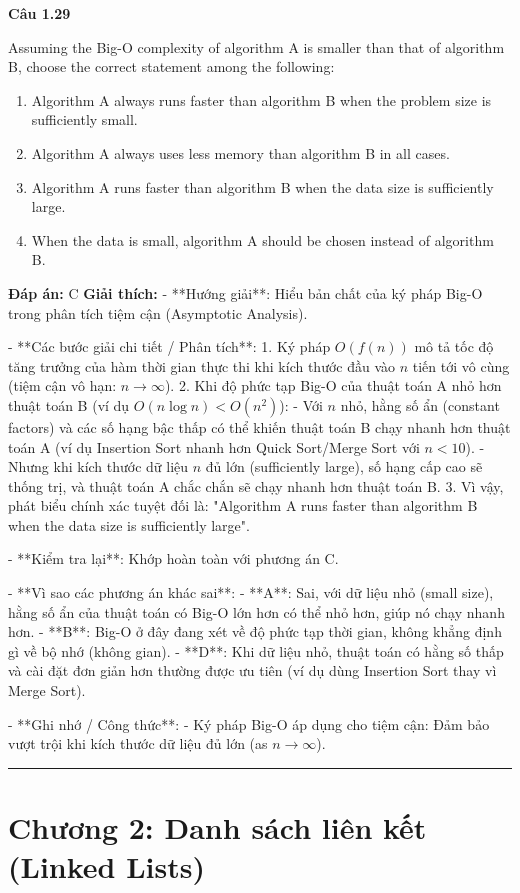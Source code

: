 \documentclass[11pt,a4paper]{article}
\newenvironment{question}[1]{%
  \par\vspace{1em}\noindent\textbf{\large Câu #1}\par\vspace{0.4em}
}{%
  \par\vspace{1em}\hrule\vspace{0.6em}
}
\newenvironment{choices}{%
  \begin{enumerate}[label=\textbf{\Alph*.},leftmargin=2.2em,itemsep=2pt,topsep=3pt]
}{%
  \end{enumerate}
}
\newcommand{\choice}{\item}
\begin{document}
\begin{question}{1.29}
Assuming the Big-O complexity of algorithm A is smaller than that of algorithm B, choose the correct statement among the following:
\begin{choices}
\choice Algorithm A always runs faster than algorithm B when the problem size is sufficiently small.
\choice Algorithm A always uses less memory than algorithm B in all cases.
\choice Algorithm A runs faster than algorithm B when the data size is sufficiently large.
\choice When the data is small, algorithm A should be chosen instead of algorithm B.
\end{choices}
\textbf{Đáp án:} C
\textbf{Giải thích:} - **Hướng giải**:
  Hiểu bản chất của ký pháp Big-O trong phân tích tiệm cận (Asymptotic Analysis).

- **Các bước giải chi tiết / Phân tích**:
  1. Ký pháp \(O(f(n))\) mô tả tốc độ tăng trưởng của hàm thời gian thực thi khi kích thước đầu vào \(n\) tiến tới vô cùng (tiệm cận vô hạn: \(n \rightarrow \infty\)).
  2. Khi độ phức tạp Big-O của thuật toán A nhỏ hơn thuật toán B (ví dụ \(O(n \log n) < O(n^2)\)):
     - Với \(n\) nhỏ, hằng số ẩn (constant factors) và các số hạng bậc thấp có thể khiến thuật toán B chạy nhanh hơn thuật toán A (ví dụ Insertion Sort nhanh hơn Quick Sort/Merge Sort với \(n < 10\)).
     - Nhưng khi kích thước dữ liệu \(n\) đủ lớn (sufficiently large), số hạng cấp cao sẽ thống trị, và thuật toán A chắc chắn sẽ chạy nhanh hơn thuật toán B.
  3. Vì vậy, phát biểu chính xác tuyệt đối là: "Algorithm A runs faster than algorithm B when the data size is sufficiently large".

- **Kiểm tra lại**:
  Khớp hoàn toàn với phương án C.

- **Vì sao các phương án khác sai**:
  - **A**: Sai, với dữ liệu nhỏ (small size), hằng số ẩn của thuật toán có Big-O lớn hơn có thể nhỏ hơn, giúp nó chạy nhanh hơn.
  - **B**: Big-O ở đây đang xét về độ phức tạp thời gian, không khẳng định gì về bộ nhớ (không gian).
  - **D**: Khi dữ liệu nhỏ, thuật toán có hằng số thấp và cài đặt đơn giản hơn thường được ưu tiên (ví dụ dùng Insertion Sort thay vì Merge Sort).

- **Ghi nhớ / Công thức**:
  - Ký pháp Big-O áp dụng cho tiệm cận: Đảm bảo vượt trội khi kích thước dữ liệu đủ lớn (as \(n \to \infty\)).
\end{question}

\newpage
\section*{Chương 2: Danh sách liên kết (Linked Lists)}
\end{document}

